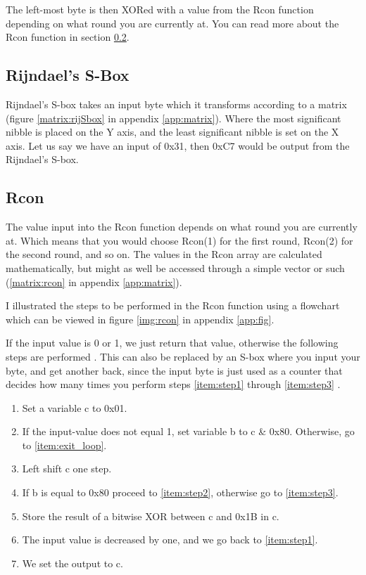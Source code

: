 The left-most byte is then XORed with a value from the Rcon function depending 
on what round you are currently at. You can read more about the Rcon function in 
section \ref{ch:Rcon}.

\subsection{Rijndael's S-Box}
Rijndael's S-box takes an input byte which it transforms according to a matrix 
(figure \ref{matrix:rijSbox} in appendix \ref{app:matrix}). Where the most 
significant nibble is placed on the Y axis, and the least significant nibble 
is set on the X axis. Let us say we have an input of 0x31, then 0xC7 would be 
output from the Rijndael's S-box.

 \subsection{Rcon} \label{ch:Rcon}
The value input into the Rcon function depends on what round you are currently 
at. Which means that you would choose Rcon(1) for the first round, Rcon(2) for 
the second round, and so on. The values in the Rcon array are calculated 
mathematically, but might as well be accessed through a simple vector or such (\ref{matrix:rcon} in appendix \ref{app:matrix}).

I illustrated the steps to be performed in the Rcon function using a flowchart 
which can be viewed in figure \ref{img:rcon} in appendix \ref{app:fig}.

If the input value is 0 or 1, we just return that value, otherwise the 
following steps are performed \citep{RijndaelKeySchedule}. This can also be 
replaced by an S-box where you input your byte, and get another back, since the 
input byte is just used as a counter that decides how many times you perform 
steps \ref{item:step1} through \ref{item:step3} 
.

\begin{enumerate}
\item Set a variable c to 0x01.
\item If the input-value does not equal 1, set variable b to c \& 0x80. 
Otherwise, go to \ref{item:exit_loop}. 
\label{item:step1}
\item Left shift c one step.
\item If b is equal to 0x80 proceed to \ref{item:step2}, otherwise go to 
\ref{item:step3}.
\item Store the result of a bitwise XOR between c and 0x1B in c.
\label{item:step2}
\item The input value is decreased by one, and we go back to \ref{item:step1}.
\label{item:step3}
\item We set the output to c.
\label{item:exit_loop}
\end{enumerate}
